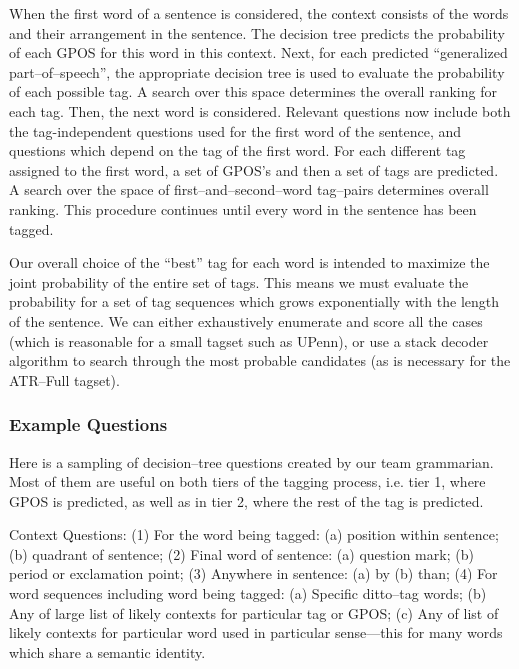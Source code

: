 When the first word of a sentence is considered, the context consists
of the words and their arrangement in the sentence. The decision tree
predicts the probability of each GPOS for this word in this context. 
Next, for each predicted ``generalized part--of--speech'', the
appropriate decision tree is used to evaluate the probability of each
possible tag.  A search over this space determines the overall ranking
for each tag.  Then, the next word is considered. Relevant questions
now include both the tag-independent questions used for the first word
of the sentence, and questions which depend on the tag of the first
word. For each different tag assigned to the first word, a set of
GPOS's and then a set of tags are predicted. A search over the space
of first--and--second--word tag--pairs determines overall ranking. 
This procedure continues until every word in the sentence has been
tagged.

Our overall choice of the ``best'' tag for each word is intended to
maximize the joint probability of the entire set of tags.  This means
we must evaluate the probability for a set of tag sequences which
grows exponentially with the length of the sentence.  We can either
exhaustively enumerate and score all the cases (which is reasonable
for a small tagset such as UPenn), or use a stack decoder algorithm
\cite{Bahl+al:max,Jelinek:fast,Paul:algorithms} to search through the
most probable candidates (as is necessary for the ATR--Full tagset).

 
\subsubsection{Example Questions}

Here is a sampling of decision--tree questions created by our team
grammarian. Most of them are useful on both tiers of the tagging
process, i.e. tier 1, where GPOS is predicted, as well as in tier 2,
where the rest of the tag is predicted.

Context Questions: (1) For the word being tagged: (a) position within
sentence; (b) quadrant of sentence; (2) Final word of sentence: (a)
question mark; (b) period or exclamation point; (3) Anywhere in
sentence: (a) by (b) than; (4) For word sequences including word being
tagged: (a) Specific ditto--tag words; (b) Any of large list of likely
contexts for particular tag or GPOS; (c) Any of list of likely
contexts for particular word used in particular sense---this for many
words which share a semantic identity.

